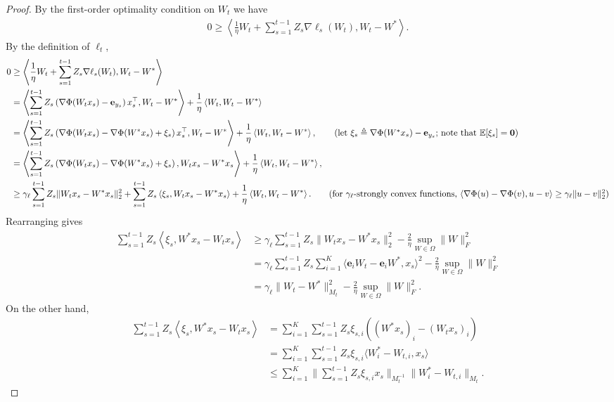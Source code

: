 \documentclass{article}
\newcommand{\nb}{\nabla}
\newcommand{\e}{\mathbf{e}}
\newcommand{\field}[1]{\mathbb{#1}}
\newcommand{\E}{\field{E}}
\newcommand{\inner}[1]{ \left\langle {#1} \right\rangle }
\begin{document}
\begin{proof}
By the first-order optimality condition on $W_{t}$ we have
\begin{align*}
    0\geq \inner{\frac{1}{\eta} W_{t} + \sum_{s=1}^{t-1} Z_s\nb\ell_s(W_t), W_{t}-W^*}. 
\end{align*}
By the definition of $\ell_t$, 
\begin{align*}
    0 &\geq \inner{\frac{1}{\eta} W_{t} + \sum_{s=1}^{t-1} Z_s\nb\ell_s(W_t),  W_{t}-W^*} \\
    & = \inner{\sum_{s=1}^{t-1} Z_s\left(\nb\Phi(W_t x_s) - \e_{y_s} \right)x_s^\top,  W_{t}-W^*} + \frac{1}{\eta}\inner{W_t, W_t-W^*} \\
    & = \inner{\sum_{s=1}^{t-1} Z_s\left(\nb\Phi(W_t x_s) - \nb\Phi(W^*x_s) + \xi_s \right)x_s^\top, W_{t}-W^*} + \frac{1}{\eta}\inner{W_t, W_t-W^*} , \tag{let $\xi_s\triangleq \nb\Phi(W^*x_s)-\e_{y_s}$; note that $\E[\xi_s]=\mathbf{0}$} \\ 
    & = \inner{\sum_{s=1}^{t-1} Z_s\left(\nb\Phi(W_t x_s) - \nb\Phi(W^*x_s) + \xi_s \right), W_t x_s- W^*x_s} + \frac{1}{\eta}\inner{W_t, W_t-W^*}, \\
    & \geq \gamma_\ell \sum_{s=1}^{t-1} Z_s\|W_tx_s-W^*x_s\|_2^2 + \sum_{s=1}^{t-1} Z_s\inner{\xi_s, W_tx_s-W^*x_s} + \frac{1}{\eta} \inner{W_t, W_t-W^*}. \tag{for $\gamma_\ell$-strongly convex functions, $\inner{\nb\Phi(u)-\nb\Phi(v), u-v}\geq \gamma_\ell\|u-v\|_2^2$}
\end{align*}
Rearranging gives 
\begin{align}
    \sum_{s=1}^{t-1} Z_s\inner{\xi_s, W^*x_s-W_tx_s} &\geq \gamma_\ell \sum_{s=1}^{t-1} Z_s\|W_tx_s-W^*x_s\|_2^2 - \frac{2}{\eta} \sup_{W\in \Omega}\|W\|_F^2 \nonumber \\
    &= \gamma_\ell \sum_{s=1}^{t-1} Z_s\sum_{i=1}^K \langle \e_iW_t-\e_iW^*, x_s\rangle^2 - \frac{2}{\eta} \sup_{W\in \Omega}\|W\|_F^2 \nonumber \\
    & = \gamma_\ell \|W_t-W^*\|_{M_t}^2 - \frac{2}{\eta} \sup_{W\in \Omega}\|W\|_F^2.  \label{eqn:lower}
\end{align}
On the other hand, 
\begin{align}
    \sum_{s=1}^{t-1} Z_s\inner{\xi_s, W^*x_s-W_tx_s} &= \sum_{i=1}^K  \sum_{s=1}^{t-1} Z_s\xi_{s,i} ((W^*x_s)_i-(W_tx_s)_i) \nonumber \\
    & = \sum_{i=1}^K  \sum_{s=1}^{t-1} Z_s\xi_{s,i} \langle W^*_i-W_{t,i}, x_s\rangle \nonumber \\
    &\leq \sum_{i=1}^K \Bigg\| \sum_{s=1}^{t-1} Z_s\xi_{s,i}x_s \Bigg\|_{M_t^{-1}} \|W^*_i-W_{t,i}\|_{M_t}.   \label{eqn:upper}

\end{align}
\end{proof}
\end{document}
